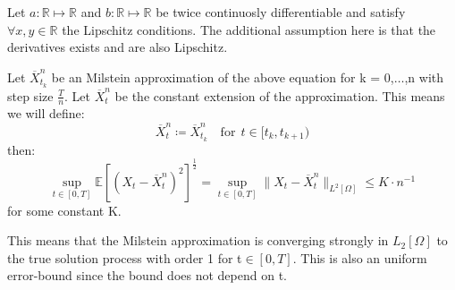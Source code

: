 \begin{theorem}
Let \(a:\mathbb{R}\mapsto\mathbb{R}\) and \(b:\mathbb{R}\mapsto\mathbb{R}\) be twice continuosly differentiable and satisfy \(\forall x,y\in\mathbb{R}\) the Lipschitz conditions.
The additional assumption here is that the derivatives exists and are also Lipschitz.

Let \(\overline{X}^n_{t_{k}}\) be an Milstein approximation of the above equation for k = 0,\(\dots\),n with step size \(\frac{T}{n}\).
Let \(\overline{X}^n_{t}\) be the constant extension of the approximation. This means we will define:
\[\overline{X}^n_{t}\coloneqq\overline{X}^n_{t_{k}}\quad\text{for}\:\:t\in[t_k,t_{k+1})\]
then:
\[\sup_{t\in[0,T]}\mathbb{E}[(X_t-\overline{X}^n_{t})^2]^{\frac{1}{2}} = \sup_{t\in[0,T]}\|X_t-\overline{X}^n_{t}\|_{L^2[\Omega]}\leq K\cdot n^{-1}\]
for some constant K.
\end{theorem}
This means that the Milstein approximation is converging strongly in \(L_2[\Omega]\) to the true solution process with order 1 for t\(\in\![0,T]\). This is also an uniform error-bound since the bound does not depend on t.

